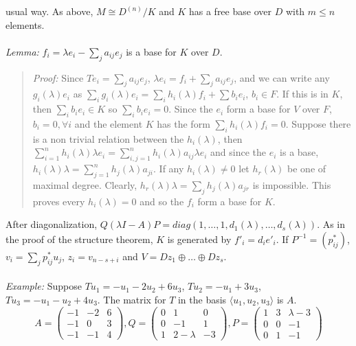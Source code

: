 usual way.  As above, $M \cong {D^{(n)}}/{K}$ and $K$ has a free base over $D$
with $m \le n$ elements.\\
\\
\emph{Lemma:} $f_i = \lambda e_i - \sum_j a_{ij}e_j$ is a base for $K$ over $D$.
\begin{quote}
\emph{Proof:}
Since $Te_i= \sum_j a_{ij} e_j$,
$\lambda e_i= f_i+ \sum_j a_{ij} e_j$, and we can write any $g_i(\lambda) e_i$ as
$\sum_i g_i( \lambda ) e_i = \sum_i h_i( \lambda )f_i + \sum b_i e_i$, $b_i \in F$.
If this is in $K$, then $\sum_i b_i e_i \in K$ so $\sum_i b_i e_i = 0$.
Since the $e_i$ form a base for $V$ over $F$, $b_i= 0, \forall i$ and the element
$K$ has the form $\sum_i h_i( \lambda) f_i = 0$.  Suppose there is a non trivial relation
between the $h_i( \lambda )$, then
$\sum_{i=1}^n h_i( \lambda) \lambda e_i = \sum_{i,j=1}^n h_i( \lambda) a_{ij} \lambda e_i$
and since the $e_i$ is a base,
$h_i( \lambda) \lambda = \sum_{j=1}^n h_j( \lambda) a_{ji}$.
If any $h_i( \lambda ) \ne 0$ let $h_r( \lambda )$ be one of maximal degree.
Clearly,
$h_r( \lambda ) \lambda = \sum_j h_j( \lambda ) a_{jr}$ is impossible.  This proves
every $h_i( \lambda) = 0$ 
and so the $f_i$ form a base for $K$.
\end{quote}
After diagonalization,
$Q (\lambda I -A) P = diag(1,\ldots,1,d_1(\lambda), \ldots , d_s(\lambda))$.
As in the proof of the structure theorem,
$K$ is generated by $f'_i= d_i e'_i$.  If
$P^{-1}= (p^*_{ij})$, $v_i= \sum_j p^*_{ij} u_j$, $z_i= v_{n-s+i}$ and
$V= D z_1 \oplus \ldots \oplus D z_s$.
\\
\\
\emph{Example:}
Suppose
$T u_1= -u_1 - 2 u_2 + 6 u_3$,
$T u_2= -u_1 + 3 u_3$,
$T u_3= -u_1 - u_2 + 4 u_3$.  The matrix for $T$ in the basis
$\langle u_1 , u_2 , u_3 \rangle$ is $A$.
$$
A=
\left(
\begin{array}{ccc}
-1 &  -2 &  6 \\
-1 &  0 &  3 \\
-1 &  -1 &  4
\end{array}
\right),
Q=
\left(
\begin{array}{ccc}
0 & 1 & 0\\
0 & -1 & 1\\
1 &  2-\lambda & -3
\end{array}
\right),
P=
\left(
\begin{array}{ccc}
1 & 3 & \lambda-3\\
0 & 0 & -1\\
0 & 1 &  -1
\end{array}
\right)
$$
